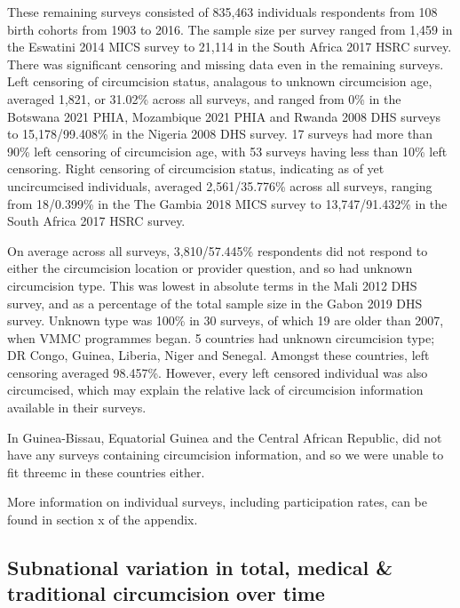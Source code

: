 \documentclass{article}
\begin{document}
These remaining surveys consisted of 835,463 individuals respondents from 108 birth cohorts from 1903 to
2016. The sample size per survey ranged from 1,459 in the Eswatini 2014 MICS survey to 21,114 in the South
Africa 2017 HSRC survey.
There was significant censoring and missing data even in the remaining surveys. Left censoring of circumcision
status, analagous to unknown circumcision age, averaged 1,821, or 31.02\% across all surveys, and ranged from
0\% in the Botswana 2021 PHIA, Mozambique 2021 PHIA and Rwanda 2008 DHS surveys to 15,178/99.408\%
in the Nigeria 2008 DHS survey. 17 surveys had more than 90\% left censoring of circumcision age, with
53 surveys having less than 10\% left censoring. Right censoring of circumcision status, indicating as of yet
uncircumcised individuals, averaged 2,561/35.776\% across all surveys, ranging from 18/0.399\% in the The
Gambia 2018 MICS survey to 13,747/91.432\% in the South Africa 2017 HSRC survey.

On average across all surveys, 3,810/57.445\% respondents did not respond to either the circumcision location
or provider question, and so had unknown circumcision type. This was lowest in absolute terms in the Mali
2012 DHS survey, and as a percentage of the total sample size in the Gabon 2019 DHS survey. Unknown
type was 100\% in 30 surveys, of which 19 are older than 2007, when VMMC programmes began. 5 countries
had unknown circumcision type; DR Congo, Guinea, Liberia, Niger and Senegal. Amongst these countries,
left censoring averaged 98.457\%. However, every left censored individual was also circumcised, which may
explain the relative lack of circumcision information available in their surveys.

In Guinea-Bissau, Equatorial Guinea and the Central African Republic, did not have any surveys containing
circumcision information, and so we were unable to fit threemc in these countries either.

More information on individual surveys, including participation rates, can be found in section x of the
appendix.

\subsection{Subnational variation in total, medical \& traditional circumcision over time}
\label{sec:org0d1ffe6}
\end{document}
